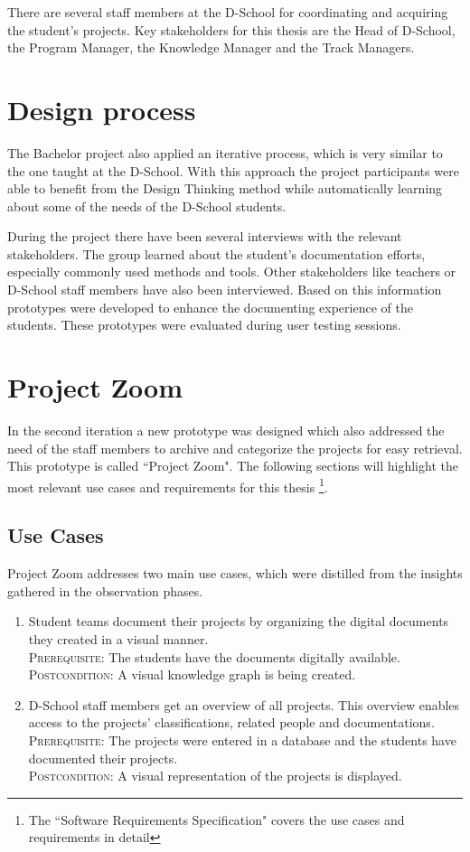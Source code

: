 There are several staff members at the D-School for coordinating and acquiring the student's projects. Key stakeholders for this thesis are the Head of D-School, the Program Manager, the Knowledge Manager and the Track Managers.

\section{Design process}
The Bachelor project also applied an iterative process, which is very similar to the one taught at the D-School. With this approach the project participants were able to benefit from the Design Thinking method while automatically learning about some of the needs of the D-School students.

During the project there have been several interviews with the relevant stakeholders. The group learned about the student's documentation efforts, especially commonly used methods and tools. Other stakeholders like teachers or D-School staff members have also been interviewed. Based on this information prototypes were developed to enhance the documenting experience of the students. These prototypes were evaluated during user testing sessions.

\section{Project Zoom}
In the second iteration a new prototype was designed which also addressed the need of the staff members to archive and categorize the projects for easy retrieval. This prototype is called ``Project Zoom". The following sections will highlight the most relevant use cases and requirements for this thesis \footnote{The ``Software Requirements Specification"\cite{ReqSpec} covers the use cases and requirements in detail}.

\subsection{Use Cases}
Project Zoom addresses two main use cases, which were distilled from the insights gathered in the observation phases.

\begin{enumerate}
\item Student teams document their projects by organizing the digital documents they created in a visual manner.\\
\textsc{Prerequisite}: The students have the documents digitally available.\\
\textsc{Postcondition}: A visual knowledge graph is being created.

\item D-School staff members get an overview of all projects. This overview enables access to the projects' classifications, related people and documentations.\\
\textsc{Prerequisite}: The projects were entered in a database and the students have documented their projects.\\
\textsc{Postcondition}: A visual representation of the projects is displayed.
\end{enumerate}


